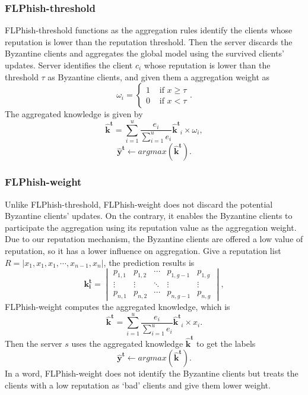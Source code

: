 \documentclass[journal]{IEEEtran}
\begin{document}
\subsubsection{{FLPhish-threshold}}
FLPhish-threshold functions as the aggregation rules identify the clients whose reputation is lower than the reputation threshold. Then the server discards the Byzantine clients and aggregates the global model using the survived clients' updates. Server identifies the client ${c_{i}}$ whose reputation is lower than the threshold $\tau$ as Byzantine clients, and given them a aggregation weight as
\begin{equation}
  \omega_{i}=\begin{cases}
    1 & \text{ if } x\geq \tau \\ 
    0 & \text{ if } x< \tau 
    \end{cases}.
\end{equation} 
The aggregated knowledge is given by
\begin{equation}
  \mathbf{\hat{k}^t}=\sum_{i=1}^{u}\frac{e_i}{\sum_{i=1}^{u}e_i}\mathbf{\hat{k}^t}_i\times \omega_{i},
\end{equation}
\begin{equation}
  \mathbf{\hat{y}^t}\gets argmax(\mathbf{\hat{k}^t}).
\end{equation} 
\subsubsection{{FLPhish-weight}}
Unlike FLPhish-threshold, FLPhish-weight does not discard the potential Byzantine clients' updates. On the contrary, it enables the Byzantine clients to participate the aggregation using its reputation value as the aggregation weight. Due to our reputation mechanism, the Byzantine clients are offered a low value of reputation, so it has a lower influence on aggregation.
Give a reputation list $R=\left | x_{1},x_{1},x_{1},\cdots ,x_{n-1},x_{n} \right |$, the prediction results is 
  \begin{equation}
    \mathbf{k_i^t}=\begin{vmatrix}
      p_{1,1} & p_{1,2} & \cdots  & p_{1,g-1} & p_{1,g}\\ 
      \vdots  & \vdots & \ddots  & \vdots & \vdots\\ 
      p_{n,1} & p_{n,2} & \cdots  & p_{n,g-1} & p_{n,g}
      \end{vmatrix},
  \end{equation}
  FLPhish-weight computes the aggregated knowledge, which is
    \begin{equation}
    \mathbf{\hat{k}^t}=\sum_{i=1}^{u}\frac{e_i}{\sum_{i=1}^{u}e_i}\mathbf{\hat{k}^t}_i\times x_{i}.
  \end{equation}
  Then the server $s$ uses the aggregated knowledge $\mathbf{\hat{k}^t}$ to get the labels
  \begin{equation}
    \mathbf{\hat{y}^t}\gets argmax(\mathbf{\hat{k}^t}).
  \end{equation} 
In a word, FLPhish-weight does not identify the Byzantine clients but treats the clients with a low reputation as `bad' clients and give them lower weight.
\end{document}
